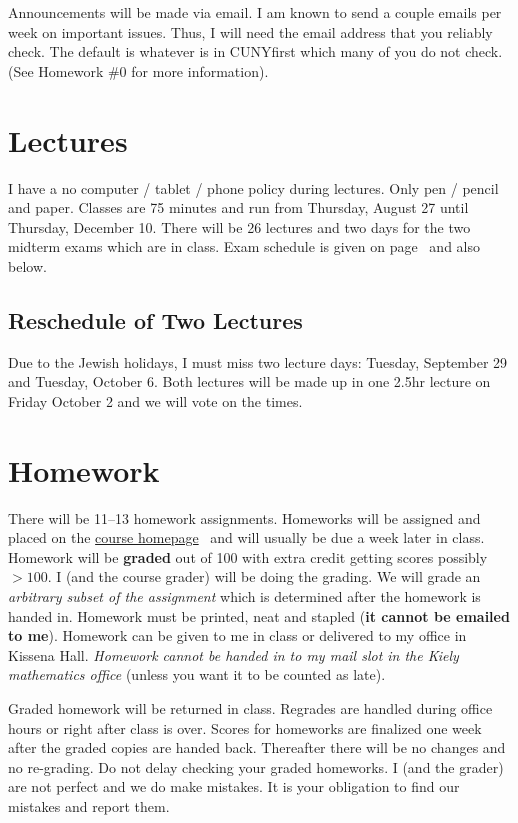 \documentclass[12pt]{article}
\newcommand{\coursewebpage}{\href{https://github.com/kapelner/QC_Math_241_Fall_2015}{course homepage}}
\begin{document}
Announcements will be made via email. I am known to send a couple emails per week on important issues. Thus, I will need the email address that you reliably check. The default is whatever is in CUNYfirst which many of you do not check. (See Homework \#0 for more information).

\section*{Lectures}

I have a no computer / tablet / phone policy during lectures. Only pen / pencil and paper. Classes are 75 minutes and run from Thursday, August 27 until Thursday, December 10. There will be 26 lectures and two days for the two midterm exams which are in class. Exam schedule is given on page~\pageref{subsec:exam_schedule} and also below.

\subsection*{Reschedule of Two Lectures}

Due to the Jewish holidays, I must miss two lecture days: Tuesday, September 29 and Tuesday, October 6. Both lectures will be made up in one 2.5hr lecture on Friday October 2 and we will vote on the times.


\section*{Homework}

There will be 11--13 homework assignments. Homeworks will be assigned and placed on the \coursewebpage~ and will usually be due a week later in class. Homework will be \textbf{graded} out of 100 with extra credit getting scores possibly $> 100$. I (and the course grader) will be doing the grading. We will grade an \textit{arbitrary subset of the assignment} which is determined after the homework is handed in. Homework must be printed, neat and stapled (\textbf{it cannot be emailed to me}). Homework can be given to me in class or delivered to my office in Kissena Hall. \textit{Homework cannot be handed in to my mail slot in the Kiely mathematics office} (unless you want it to be counted as late).

Graded homework will be returned in class. Regrades are handled during office hours or right after class is over. Scores for homeworks are finalized one week after the graded copies are handed back. Thereafter there will be no changes and no re-grading. Do not delay checking your graded homeworks. I (and the grader) are not perfect and we do make mistakes. It is your obligation to find our mistakes and report them.
\end{document}
